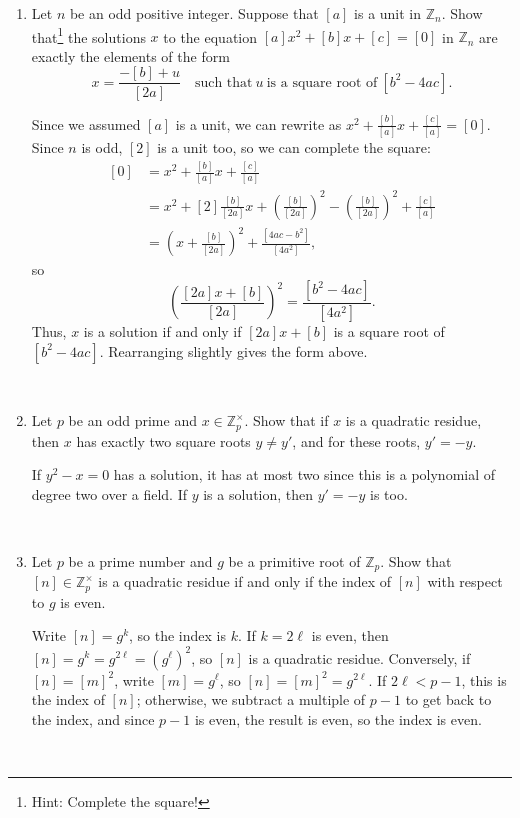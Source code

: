 \documentclass[12pt]{amsart}
\newcommand{\Z}{\mathbb{Z}}
\newcommand{\solution}[1]{\ifthenelse {\equal{\displaysol}{1}} {\begin{framed}{\color{meretale}\noindent #1}\end{framed}} { \ }}
\begin{document}
\begin{enumerate}
\item Let $n$ be an odd positive integer. Suppose that $[a]$ is a unit in $\Z_n$. Show that\footnote{Hint: Complete the square!} the solutions $x$ to the equation $ [a] x^2 + [b] x + [c] = [0]$ in $\Z_n$ are exactly the elements of the form
\[ x=\frac{-[b] + u}{[2a]} \quad \text{such that} \ u \ \text{is a square root of} \ [b^2-4ac]. \]


\solution{Since we assumed $[a]$ is a unit, we can rewrite as $x^2 + \frac{[b]}{[a]} x + \frac{[c]}{[a]} = [0]$. Since $n$ is odd, $[2]$ is a unit too, so we can complete the square:
\[\begin{aligned}  [0] &= x^2 + \frac{[b]}{[a]} x + \frac{[c]}{[a]} \\
&= x^2 + [2] \frac{[b]}{[2a]} x + \left(\frac{[b]}{[2a]} \right)^2 -  \left(\frac{[b]}{[2a]} \right)^2 + \frac{[c]}{[a]} \\
&= \left(x+  \frac{[b]}{[2a]} \right)^2  +  \frac{[4ac- b^2]}{[4a^2]},
\end{aligned}\]
so
\[ \left(\frac{[2a] x+ [b]}{[2a]} \right)^2 = \frac{[b^2-4ac]}{[4a^2]}.\]
Thus, $x$ is a solution if and only if $[2a]x + [b]$ is a square root of $[b^2-4ac]$. Rearranging slightly gives the form above.
}



\item Let $p$ be an odd prime and $x \in \Z_p^\times$. Show that if $x$ is a quadratic residue, then $x$ has exactly two square roots $y\neq y'$, and for these roots, $y'=-y$.

\solution{If $y^2 - x = 0$ has a solution, it has at most two since this is a polynomial of degree two over a field. If $y$ is a solution, then $y'=-y$ is too.}

\item\label{indexres} Let $p$ be a prime number and $g$ be a primitive root of $\Z_p$. Show that $[n]\in \Z_p^\times$ is a quadratic residue if and only if the index of $[n]$ with respect to $g$ is even.

\solution{Write $[n] = g^k$, so the index is $k$. If $k=2\ell$ is even, then $[n] = g^k = g^{2\ell} = (g^{\ell})^2$, so $[n]$ is a quadratic residue. Conversely, if $[n]= [m]^2$, write $[m] = g^\ell$, so $[n]=[m]^2 = g^{2 \ell}$. If $2\ell < p-1$, this is the index of $[n]$; otherwise, we subtract a multiple of $p-1$ to get back to the index, and since $p-1$ is even, the result is even, so the index is even.}

\end{enumerate}
\end{document}
